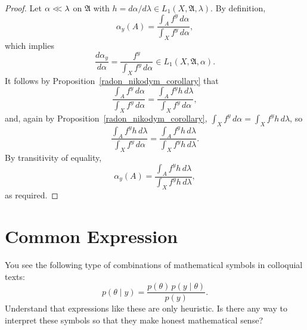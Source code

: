 \documentclass[
twoside=true,
paper=letter,
fontsize=9pt,
pagesize=auto,
leqno,
openany,
headsepline,
overfullrule,
]{scrbook}
\theoremstyle{plain}
\theoremstyle{plain}
\theoremstyle{definition}
\theoremstyle{bfnoteitalic}
\theoremstyle{bfnoteroman}
\newcommand{\sigalg}[1]{\mathfrak{#1}}
\newcommand{\funcf}{f}
\newcommand{\funch}{h}
\newcommand{\function}{f}
\newcommand{\functioniii}{h}
\newcommand{\measurespace}{X}
\newcommand{\abscont}{\mathrel{< \kern-3.5pt <}}
\newcommand{\measlambda}{\lambda}
\newcommand{\pspace}{\measurespace}%
\newcommand{\pspaceset}{A}
\newcommand{\sspaceelt}{y}
\newcommand{\pspacesig}{\sigalg{A}}
\newcommand{\marginalone}{\alpha}%
\newcommand{\prior}{\marginalone}
\begin{document}
\begin{proof}
Let
$\prior\abscont\measlambda$ on $\pspacesig$ with
$\funch
= d\prior/d\measlambda
\in L_1(\pspace, \pspacesig, \measlambda)$.
By definition,
\[
\prior_\sspaceelt(\pspaceset) =
\frac{\int_\pspaceset \function^\sspaceelt \, d\prior}
{\int_\pspace \function^\sspaceelt \, d\prior},
\]
which implies
\[
\frac{d\prior_\sspaceelt}{d\prior}
=
\frac{\funcf^\sspaceelt}
{\int_\pspace \function^\sspaceelt \, d\prior}
\in L_1(\pspace, \pspacesig, \prior).
\]
It follows by Proposition~\ref{radon_nikodym_corollary} that
\[
\frac{\int_\pspaceset \function^\sspaceelt \, d\prior}
{\int_\pspace \function^\sspaceelt \, d\prior}
=
\frac{\int_\pspaceset\function^\sspaceelt\functioniii\,d\measlambda}
{\int_\pspace\function^\sspaceelt\,d\prior},
\]
and, again by Proposition~\ref{radon_nikodym_corollary},
$\int_\pspace\function^\sspaceelt\,d\prior
=
\int_\pspace\function^\sspaceelt\functioniii\,d\measlambda$,
so
\[
\frac{\int_\pspaceset\function^\sspaceelt\functioniii\,d\measlambda}
{\int_\pspace\function^\sspaceelt\,d\prior}
=
\frac{\int_\pspaceset\function^\sspaceelt\functioniii\,d\measlambda}
{\int_\pspace\function^\sspaceelt\functioniii\,d\measlambda}.
\]
By transitivity of equality,
\[
\prior_\sspaceelt(\pspaceset)
=
\frac{\int_\pspaceset\function^\sspaceelt\functioniii\,d\measlambda}
{\int_\pspace\function^\sspaceelt\functioniii\,d\measlambda},
\]
as required.
\end{proof}





\section{Common Expression}\label{common_expression}
You see the following type of combinations of mathematical symbols in colloquial texts:
\begin{equation}\label{quaint}
p(\theta \mid y)
=
\frac{p(\theta) \, p(y \mid \theta)}
{p(y)}.
\end{equation}
Understand that expressions like these are only heuristic.
Is there any way to interpret these symbols so that they make honest mathematical sense?
\end{document}
